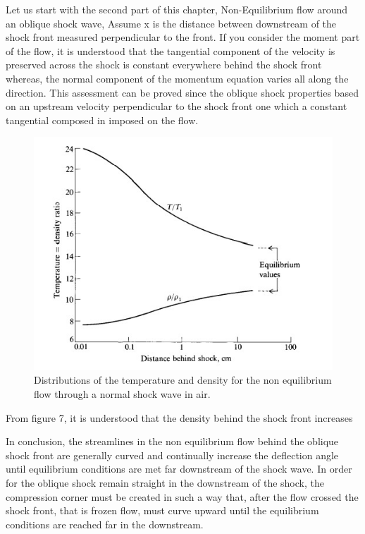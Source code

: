 Let us start with the second part of this chapter, Non-Equilibrium flow around an oblique shock wave, Assume x is the distance between downstream of the shock front measured  perpendicular to the front. If you consider the moment part of the flow, it is understood that the tangential component of the velocity is preserved across the shock is constant everywhere behind the shock front whereas, the normal component of the momentum equation varies all along the direction. This assessment can be proved since the oblique shock properties based on an upstream velocity perpendicular to the shock front one which a constant tangential composed in imposed on the flow.

\begin{figure}[ht]

\centering
  \includegraphics[width=0.7\linewidth]{images/distance_behind hsock.jpg}
  \caption{ Distributions of the temperature and density for the non equilibrium flow
through a normal shock wave in air.}
  \label{fig:boat1}
\end{figure}

From figure 7, it is understood that the density behind the shock front increases

In conclusion, the streamlines in the non equilibrium flow behind the oblique shock front are generally curved and continually  increase the deflection angle until equilibrium conditions are met far downstream of the shock wave. In order for the oblique shock remain straight in the downstream of the shock, the compression corner must be created in such a way that, after the flow crossed the shock front, that is frozen flow, must curve upward until the equilibrium conditions are reached far in the downstream.

